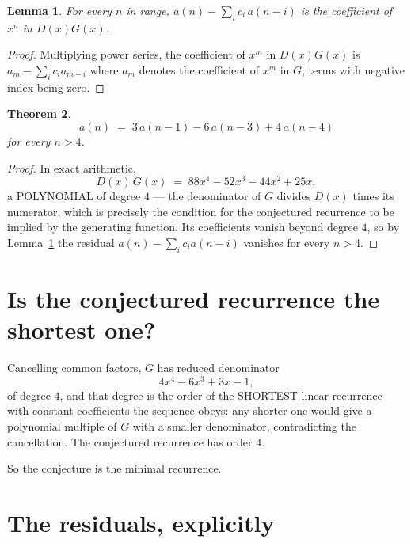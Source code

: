 \documentclass[11pt,a4paper]{article}
\theoremstyle{plain}
\newtheorem{theorem}{Theorem}
\newtheorem{lemma}[theorem]{Lemma}
\theoremstyle{definition}
\begin{document}
\begin{lemma}\label{lem:key}
For every $n$ in range, $a(n)-\sum_i c_i\,a(n-i)$ is the coefficient of $x^{n}$ in
$D(x)G(x)$.
\end{lemma}

\begin{proof}
Multiplying power series, the coefficient of $x^{m}$ in $D(x)G(x)$ is
$a_m-\sum_i c_i a_{m-i}$ where $a_m$ denotes the coefficient of $x^{m}$ in $G$, terms with
negative index being zero.
\end{proof}

\begin{theorem}
\[
a(n)\;=\;3\,a(n-1) - 6\,a(n-3) + 4\,a(n-4)
\]
for every $n>4$.
\end{theorem}

\begin{proof}
In exact arithmetic,
\[
D(x)\,G(x)\;=\;88 x^{4} - 52 x^{3} - 44 x^{2} + 25 x,
\]
a POLYNOMIAL of degree $4$ --- the denominator of $G$ divides $D(x)$ times its numerator,
which is precisely the condition for the conjectured recurrence to be implied by the
generating function. Its coefficients vanish beyond degree $4$, so by
Lemma~\ref{lem:key} the residual $a(n)-\sum_ic_ia(n-i)$ vanishes for every
$n>4$.
\end{proof}

\section{Is the conjectured recurrence the shortest one?}

Cancelling common factors, $G$ has reduced denominator
\[
4 x^{4} - 6 x^{3} + 3 x - 1,
\]
of degree $4$, and that degree is the order of the SHORTEST linear recurrence with
constant coefficients the sequence obeys: any shorter one would give a polynomial multiple of
$G$ with a smaller denominator, contradicting the cancellation. The conjectured recurrence has
order $4$.

So the conjecture is the minimal recurrence.

\section{The residuals, explicitly}
\end{document}
